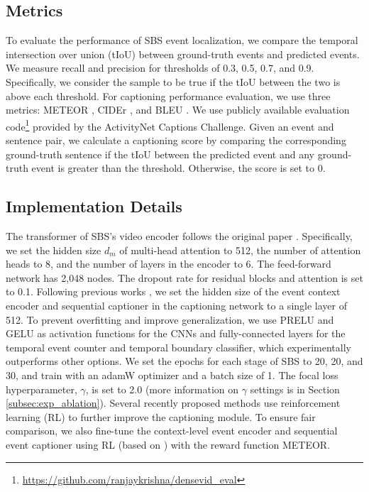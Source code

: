 \subsection{Metrics}
To evaluate the performance of SBS event localization, we compare the temporal intersection over union (tIoU) between ground-truth events and predicted events.
We measure recall and precision for thresholds of 0.3, 0.5, 0.7, and 0.9. Specifically, we consider the sample to be true if the tIoU between the two is above each threshold.
For captioning performance evaluation, we use three metrics: METEOR \cite{banerjee2005meteor}, CIDEr \cite{vedantam2015cider}, and BLEU \cite{papineni2002bleu}.
We use publicly available evaluation code\footnote{\url{https://github.com/ranjaykrishna/densevid_eval}} provided by the ActivityNet Captions Challenge.
Given an event and sentence pair, we calculate a captioning score by comparing the corresponding ground-truth sentence if the tIoU between the predicted event and any ground-truth event is greater than the threshold. Otherwise, the score is set to 0.

\subsection{Implementation Details}
\label{subsec:exp_impl}
The transformer of SBS's video encoder follows the original paper \cite{vaswani2017attention}.
Specifically, we set the hidden size $d_m$ of multi-head attention to 512, the number of attention heads to 8, and the number of layers in the encoder to 6. The feed-forward network has 2,048 nodes.
The dropout rate for residual blocks and attention is set to 0.1.
Following previous works \cite{mun2019streamlined,wang2021end}, we set the hidden size of the event context encoder and sequential captioner in the captioning network to a single layer of 512.
To prevent overfitting and improve generalization, we use PRELU \cite{he2015delving} and GELU \cite{hendrycks2016gaussian} as activation functions for the CNNs and fully-connected layers for the temporal event counter and temporal boundary classifier, which experimentally outperforms other options.
We set the epochs for each stage of SBS to 20, 20, and 30, and train with an adamW optimizer \cite{loshchilov2017decoupled} and a batch size of 1.
The focal loss hyperparameter, $\gamma$, is set to 2.0 (more information on $\gamma$ settings is in Section \ref{subsec:exp_ablation}).
Several recently proposed methods \cite{mun2019streamlined,wang2020event,deng2021sketch} use reinforcement learning (RL) to further improve the captioning module.
To ensure fair comparison, we also fine-tune the context-level event encoder and sequential event captioner using RL (based on \cite{rennie2017self}) with the reward function METEOR.

